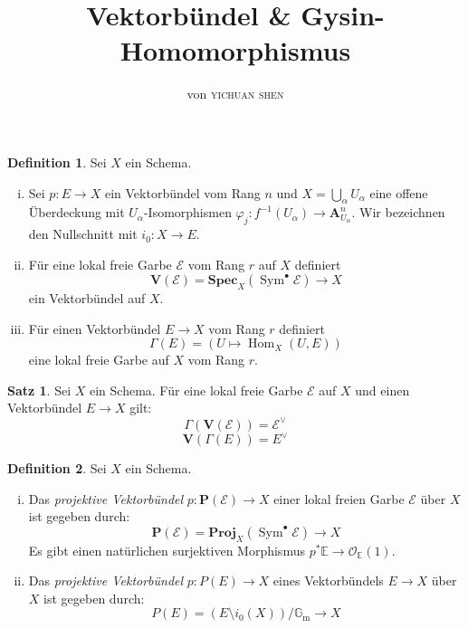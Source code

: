 \documentclass[10pt,a4paper]{article}
\author{von \textsc{yichuan shen}}
\title{Vektorbündel \& Gysin-Homomorphismus}
\begin{document}
\theoremstyle{plain}
\theoremstyle{definition}
\newtheorem{theorem}{Theorem}
\newtheorem{lemma}[theorem]{Lemma}
\newtheorem{proposition}[theorem]{Satz}
\newtheorem{corollary}[theorem]{Korollar}
\theoremstyle{definition}
\newtheorem*{definition}{Definition}
\newtheorem*{example}{Beispiel}
\theoremstyle{remark}
\newtheorem*{remark}{Bemerkung}

\maketitle

\begin{definition}
Sei $X$ ein Schema.
\begin{enumerate}[(i)]
\item Sei $p: E\to X$ ein Vektorbündel vom Rang $n$ und $X=\bigcup_\alpha U_\alpha$ eine offene Überdeckung mit $U_\alpha$-Isomorphismen $\varphi_j: f^{-1}(U_\alpha)\to \mathbf{A}_{U_\alpha}^n$. Wir bezeichnen den Nullschnitt mit $i_0: X\to E$.
\item Für eine lokal freie Garbe $\mathcal{E}$ vom Rang $r$ auf $X$ definiert
\[ \mathbf{V}(\mathcal{E}) = \mathbf{Spec}_X(\operatorname{Sym}^\bullet\mathcal{E})\to X \]
ein Vektorbündel auf $X$.
\item Für einen Vektorbündel $E\to X$ vom Rang $r$ definiert
\[ \Gamma(E) = (U\mapsto \operatorname{Hom}_X(U, E)) \]
eine lokal freie Garbe auf $X$ vom Rang $r$.
\end{enumerate}
\end{definition}

\begin{proposition}
Sei $X$ ein Schema. Für eine lokal freie Garbe $\mathcal{E}$ auf $X$ und einen Vektorbündel $E\to X$ gilt:
\[ \Gamma(\mathbf{V}(\mathcal{E})) = \mathcal{E}^\vee \]
\[ \mathbf{V}(\Gamma(E)) = E^\vee \]
\end{proposition}

\begin{definition}
Sei $X$ ein Schema.
\begin{enumerate}[(i)]
\item Das \textit{projektive Vektorbündel} $p: \mathbf{P}(\mathcal{E})\to X$ einer lokal freien Garbe $\mathcal{E}$ über $X$ ist gegeben durch:
\[ \mathbf{P}(\mathcal{E}) = \mathbf{Proj}_X(\operatorname{Sym}^\bullet\mathcal{E})\to X \]
Es gibt einen natürlichen surjektiven Morphismus $p^\ast\mathbb{E} \to \mathcal{O}_\mathbb{E}(1)$.
\item Das \textit{projektive Vektorbündel} $p: P(E)\to X$ eines Vektorbündels $E\to X$ über $X$ ist gegeben durch:
\[ P(E) = (E\setminus i_0(X))/\mathbb{G}_\text{m}\to X \]
\end{enumerate}
\end{definition}
\end{document}
